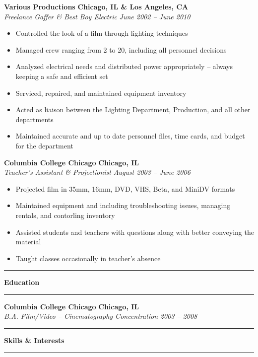 \documentclass[10pt,letterpaper]{article}			%
\newcommand{
    \JobHeader}[4]{
	\textbf{#1}
	\hfill
	\textbf{#2}
	\\
	\emph{#3}
	\hfill
	\emph{#4}
	}
\newcommand{
    \sectionHeader}[1]{
    \hrule
    \vspace{0.2em}
    {\large \textbf {#1}}
    \vspace{0.2em}
    \hrule
    \vspace{0.2em}
    }
\begin{document}
	\JobHeader{Various Productions}{Chicago, IL \& Los Angeles, CA}{Freelance Gaffer \& Best Boy Electric}{June 2002 -- June 2010}
		\begin{itemize}
		    \item Controlled the look of a film through lighting techniques 
		    \item Managed crew ranging from 2 to 20, including all personnel decisions
		    \item Analyzed electrical needs and distributed power appropriately -- always keeping a safe and efficient set
		    \item Serviced, repaired, and maintained equipment inventory
		    \item Acted as liaison between the Lighting Department, Production, and all other departments
		    \item Maintained accurate and up to date personnel files, time cards, and budget for the department
		\end{itemize}

	\JobHeader{Columbia College Chicago}{Chicago, IL}{Teacher's Assistant \& Projectionist}{August 2003 -- June 2006}
		\begin{itemize}
		    \item Projected film in 35mm, 16mm, DVD, VHS, Beta, and MiniDV formats 
		    \item Maintained equipment and including troubleshooting issues, managing rentals, and contorling inventory
		    \item Assisted students and teachers with questions along with better conveying the material
		    \item Taught classes occasionally in teacher's absence
		\end{itemize}
		
\sectionHeader{Education}

	\JobHeader{Columbia College Chicago}{Chicago, IL}{B.A. Film/Video -- Cinematography Concentration}{2003 -- 2008}

\sectionHeader{Skills \& Interests}
\end{document}
